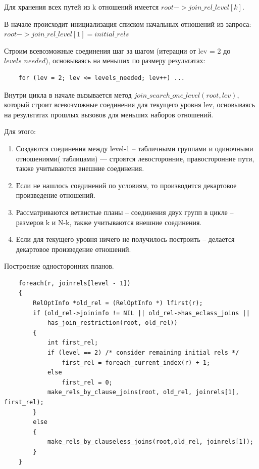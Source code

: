 \documentclass[12pt]{article}
\begin{document}
\begin{flushleft}
Для хранения всех путей из k отношений имеется
$root->join\_rel\_level[k]$.
\newline

В начале  происходит инициализация списком начальных отношений из запроса:
\newline
$root->join\_rel\_level[1] = initial\_rels$

Строим всевозможные соединения шаг за шагом (итерации от lev = 2 до $levels\_needed$), основываясь на меньших по размеру результатах:
\begin{lstlisting}
    for (lev = 2; lev <= levels_needed; lev++) ...
\end{lstlisting}

Внутри цикла в начале вызывается метод $join\_search\_one\_level(root, lev)$,
который строит всевозможные соединения для текущего уровня lev, основываясь на результатах прошлых вызовов для меньших наборов отношений.

Для этого:
\begin{enumerate}
    \item Создаются соединения между level-1 -- табличными группами и одиночными отношениями( таблицами) — строятся левосторонние, правосторонние пути, также учитываются внешние соединения.
    \item Если не нашлось соединений по условиям, то производится декартовое произведение отношений.
    \item Рассматриваются ветвистые планы -- соединения двух групп в цикле -- размеров k и N-k, также учитываются внешние соединения.
    \item Если для текущего уровня ничего не получилось построить -- делается декартовое произведение отношений.
\end{enumerate}

Построение односторонних планов.
\begin{lstlisting}
    foreach(r, joinrels[level - 1])
	{
		RelOptInfo *old_rel = (RelOptInfo *) lfirst(r);
		if (old_rel->joininfo != NIL || old_rel->has_eclass_joins ||
			has_join_restriction(root, old_rel))
		{
			int	first_rel;
			if (level == 2)	/* consider remaining initial rels */
				first_rel = foreach_current_index(r) + 1;
			else
				first_rel = 0;
			make_rels_by_clause_joins(root, old_rel, joinrels[1], first_rel);
		}
		else
		{
			make_rels_by_clauseless_joins(root,old_rel, joinrels[1]);
		}
	}
\end{lstlisting}


\end{flushleft}
\end{document}
